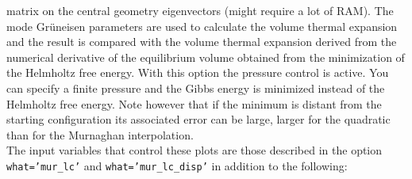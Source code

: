 \documentclass[12pt,a4paper]{article}
\begin{document}
matrix on the central geometry eigenvectors (might require a lot of RAM). 
The mode Gr\"uneisen parameters are used to calculate the volume
thermal expansion and the result is compared with the volume thermal expansion
derived from the numerical derivative of the equilibrium volume obtained
from the minimization of the Helmholtz free energy. 
With this option the pressure control is active. You can specify a
finite pressure and the Gibbs energy is minimized instead of the
Helmholtz free energy. Note however that if the minimum is distant from 
the starting configuration its associated error can be large, larger for the
quadratic than for the Murnaghan interpolation. \\
The input variables that control these plots are those described in the option
\texttt{what='mur\_lc'} and \texttt{what='mur\_lc\_disp'} in addition to the 
following:
\end{document}
